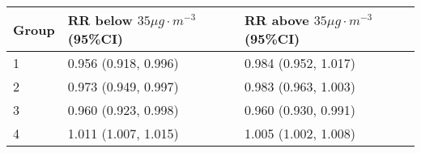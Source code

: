\begin{tabular}{lll}
  \hline
Group & RR below $35 \mu g \cdot m^{-3}$ (95\%CI) & RR above $35 \mu g \cdot m^{-3}$ (95\%CI) \\ 
  \hline
   1 & 0.956 (0.918, 0.996) & 0.984 (0.952, 1.017) \\ 
     2 & 0.973 (0.949, 0.997) & 0.983 (0.963, 1.003) \\ 
     3 & 0.960 (0.923, 0.998) & 0.960 (0.930, 0.991) \\ 
     4 & 1.011 (1.007, 1.015) & 1.005 (1.002, 1.008) \\ 
   \hline
\end{tabular}

